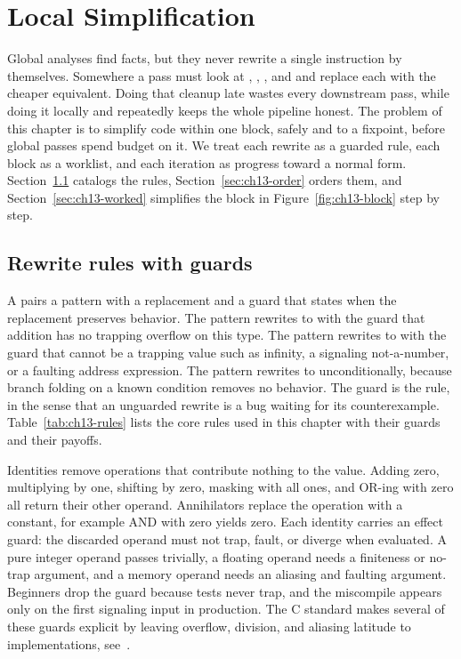 \chapter{Local Simplification}
\label{ch:ch13-local-simplification}

Global analyses find facts, but they never rewrite a single instruction by themselves.
Somewhere a pass must look at , , , and  and replace each with the cheaper equivalent.
Doing that cleanup late wastes every downstream pass, while doing it locally and repeatedly keeps the whole pipeline honest.
The problem of this chapter is to simplify code within one block, safely and to a fixpoint, before global passes spend budget on it.
We treat each rewrite as a guarded rule, each block as a worklist, and each iteration as progress toward a normal form.
Section~\ref{sec:ch13-rules} catalogs the rules, Section~\ref{sec:ch13-order} orders them, and Section~\ref{sec:ch13-worked} simplifies the block in Figure~\ref{fig:ch13-block} step by step.

\section{Rewrite rules with guards}
\label{sec:ch13-rules}

A  pairs a pattern with a replacement and a guard that states when the replacement preserves behavior.
The pattern  rewrites to  with the guard that addition has no trapping overflow on this type.
The pattern  rewrites to  with the guard that  cannot be a trapping value such as infinity, a signaling not-a-number, or a faulting address expression.
The pattern  rewrites to  unconditionally, because branch folding on a known condition removes no behavior.
The guard is the rule, in the sense that an unguarded rewrite is a bug waiting for its counterexample.
Table~\ref{tab:ch13-rules} lists the core rules used in this chapter with their guards and their payoffs.

Identities remove operations that contribute nothing to the value.
Adding zero, multiplying by one, shifting by zero, masking with all ones, and OR-ing with zero all return their other operand.
Annihilators replace the operation with a constant, for example AND with zero yields zero.
Each identity carries an effect guard: the discarded operand must not trap, fault, or diverge when evaluated.
A pure integer operand passes trivially, a floating operand needs a finiteness or no-trap argument, and a memory operand needs an aliasing and faulting argument.
Beginners drop the guard because tests never trap, and the miscompile appears only on the first signaling input in production.
The C standard makes several of these guards explicit by leaving overflow, division, and aliasing latitude to implementations, see~\cite{wg14-2011-c11}.

